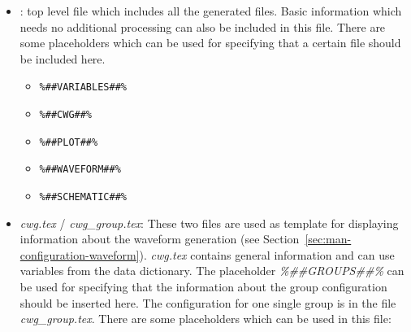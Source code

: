 \begin{itemize}
\item
  : top level file which includes all the
  generated  files. Basic information which needs no additional
  processing can also be included in this file. There are some
  placeholders which can be used for specifying that a certain file
  should be included here.

  \begin{itemize}
  \item
  	\lstinline|%##VARIABLES##%|
  \item
  \lstinline|%##CWG##%|
  \item
  \lstinline|%##PLOT##%|
  \item
  \lstinline|%##WAVEFORM##%|
  \item
  \lstinline|%##SCHEMATIC##%|
  \end{itemize}
\item
  \emph{cwg.tex} / \emph{cwg\_group.tex}: These two files are used as template 
  for
  displaying information about the waveform generation (see Section~\ref{sec:man-configuration-waveform}).
  \emph{cwg.tex} contains general information and can use variables from
  the data dictionary. The placeholder \emph{\%\#\#GROUPS\#\#\%} can be
  used for specifying that the information about the group configuration
  should be inserted here. The configuration for one single group is in
  the file \emph{cwg\_group.tex}. There are some placeholders which can
  be used in this file:


\end{itemize}
